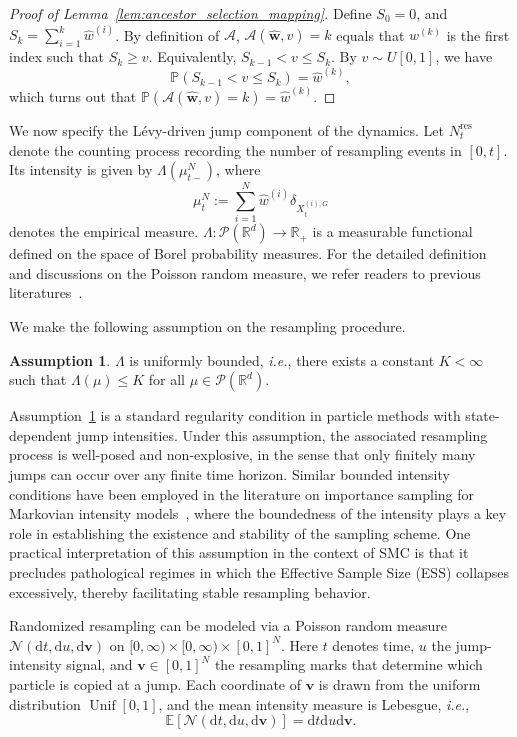 \documentclass{article}
\newcommand{\mathbbm}[1]{\boldsymbol{#1}}
\theoremstyle{plain}
\theoremstyle{definition}
\newtheorem{assumption}[theorem]{Assumption}
\theoremstyle{remark}
\newcommand{\E}{\mathbb{E}}
\newcommand{\dif}{{\mathrm{d}}}
\renewcommand{\P}{{\mathbb{P}}}
\newcommand{\R}{{\mathbb{R}}}
\begin{document}
\begin{proof}[Proof of Lemma~\ref{lem:ancestor_selection_mapping}]
Define \(S_0=0\), and \(S_k = \sum_{i=1}^k \widehat w^{(i)}\). By definition of \(\mathcal{A}\), \(\mathcal{A}(\mathbbm{\widehat  w},v)=k\) equals that \(w^{(k)}\) is the first index such that \(S_k\geq v\). Equivalently, \(S_{k-1}<v\leq S_k\). By \(v\sim U[0,1]\), we have 
$$\P(S_{k-1}<v\leq S_k) = \widehat w^{(k)},$$
which turns out that \(\P(\mathcal{A}(\mathbbm{\widehat  w},v)=k)=\widehat w^{(k)}\).
\end{proof}

We now specify the Lévy-driven jump component of the dynamics. Let \(N_t^{\mathrm{res}}\) denote the counting process recording the number of resampling events in \([0,t]\). Its intensity is given by $\Lambda(\mu^N_{t-})$, where 
$$
    \mu^N_t := \sum_{i=1}^N\widehat{w}^{(i)}\delta_{X_t^{(i),G}}
$$ 
denotes the empirical measure. $\Lambda : \mathcal{P}(\R^d) \to \R_+$ is a measurable functional defined on the space of Borel probability measures. For the detailed definition and discussions on the Poisson random measure, we refer readers to previous literatures~\cite{applebaum2009levy,ren2024discrete,ren2025unified}.

We make the following assumption on the resampling procedure.
\begin{assumption}
$\Lambda$ is uniformly bounded, \emph{i.e.}, there exists a constant $K < \infty$ such that $\Lambda(\mu) \le K$ for all $\mu \in \mathcal{P}(\R^d)$.
\label{assump:boundness_of_Lambda}
\end{assumption}

Assumption~\ref{assump:boundness_of_Lambda} is a standard regularity condition in particle methods with state-dependent jump intensities. Under this assumption, the associated resampling process is well-posed and non-explosive, in the sense that only finitely many jumps can occur over any finite time horizon. Similar bounded intensity conditions have been employed in the literature on importance sampling for Markovian intensity models~\citep{Glasserman2004Convergence, Djehiche2022MarkovianIntensity, Miasojedow2016Geometric}, where the boundedness of the intensity plays a key role in establishing the existence and stability of the sampling scheme. One practical interpretation of this assumption in the context of SMC is that it precludes pathological regimes in which the Effective Sample Size (ESS) collapses excessively, thereby facilitating stable resampling behavior.

Randomized resampling can be modeled via a Poisson random measure
\(\mathcal{N}(\dif t,\dif u, \dif \mathbbm{v})\) on \([0,\infty)\times[0,\infty)\times[0,1]^N\). Here \(t\) denotes time, \(u\) the jump-intensity signal, and \(\mathbbm{v}\in[0,1]^N\) the resampling marks that determine which particle is copied at a jump. Each coordinate of \(\mathbbm{v}\) is drawn from the uniform distribution \(\operatorname{Unif}[0,1]\), and the mean intensity measure is Lebesgue, \emph{i.e.}, 
\[
    \E[\mathcal{N}(\dif t,\dif u, \dif \mathbbm{v})]=\dif t\dif u\dif \mathbbm{v}.
\]
\end{document}
